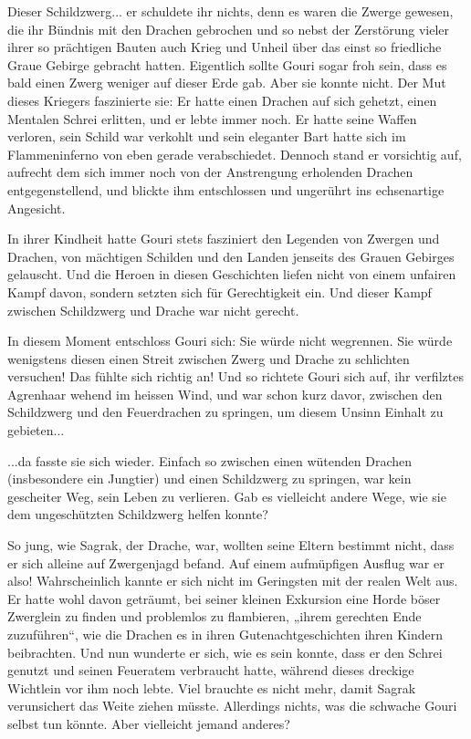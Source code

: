 Dieser Schildzwerg... er schuldete ihr nichts, denn es waren die Zwerge gewesen, die ihr Bündnis mit den Drachen gebrochen und so nebst der Zerstörung vieler ihrer so prächtigen Bauten auch Krieg und Unheil über das einst so friedliche Graue Gebirge gebracht hatten. Eigentlich sollte Gouri sogar froh sein, dass es bald einen Zwerg weniger auf dieser Erde gab. Aber sie konnte nicht. Der Mut dieses Kriegers faszinierte sie: Er hatte einen Drachen auf sich gehetzt, einen Mentalen Schrei erlitten, und er lebte immer noch. Er hatte seine Waffen verloren, sein Schild war verkohlt und sein eleganter Bart hatte sich im Flammeninferno von eben gerade verabschiedet. Dennoch stand er vorsichtig auf, aufrecht dem sich immer noch von der Anstrengung erholenden Drachen entgegenstellend, und blickte ihm entschlossen und ungerührt ins echsenartige Angesicht.

In ihrer Kindheit hatte Gouri stets fasziniert den Legenden von Zwergen und Drachen, von mächtigen Schilden und den Landen jenseits des Grauen Gebirges gelauscht. Und die Heroen in diesen Geschichten liefen nicht von einem unfairen Kampf davon, sondern setzten sich für Gerechtigkeit ein. Und dieser Kampf zwischen Schildzwerg und Drache war nicht gerecht.

In diesem Moment entschloss Gouri sich: Sie würde nicht wegrennen. Sie würde wenigstens diesen einen Streit zwischen Zwerg und Drache zu schlichten versuchen! Das fühlte sich richtig an! Und so richtete Gouri sich auf, ihr verfilztes Agrenhaar wehend im heissen Wind, und war schon kurz davor, zwischen den Schildzwerg und den Feuerdrachen zu springen, um diesem Unsinn Einhalt zu gebieten...

...da fasste sie sich wieder. Einfach so zwischen einen wütenden Drachen (insbesondere ein Jungtier) und einen Schildzwerg zu springen, war kein gescheiter Weg, sein Leben zu verlieren. Gab es vielleicht andere Wege, wie sie dem ungeschützten Schildzwerg helfen konnte?

So jung, wie Sagrak, der Drache, war, wollten seine Eltern bestimmt nicht, dass er sich alleine auf Zwergenjagd befand. Auf einem aufmüpfigen Ausflug war er also! Wahrscheinlich kannte er sich nicht im Geringsten mit der realen Welt aus. Er hatte wohl davon geträumt, bei seiner kleinen Exkursion eine Horde böser Zwerglein zu finden und problemlos zu flambieren, „ihrem gerechten Ende zuzuführen“, wie die Drachen es in ihren Gutenachtgeschichten ihren Kindern beibrachten. Und nun wunderte er sich, wie es sein konnte, dass er den Schrei genutzt und seinen Feueratem verbraucht hatte, während dieses dreckige Wichtlein vor ihm noch lebte. Viel brauchte es nicht mehr, damit Sagrak verunsichert das Weite ziehen müsste. Allerdings nichts, was die schwache Gouri selbst tun könnte. Aber vielleicht jemand anderes?

